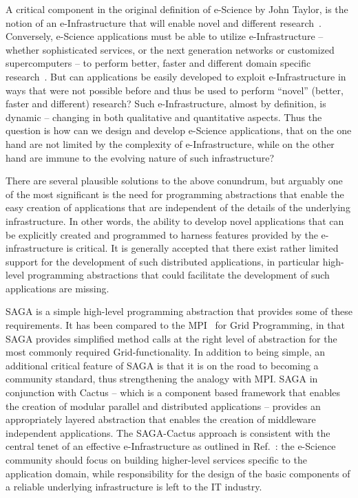 \documentclass[conference,final]{IEEEtran}
\begin{document}
A critical component in the original definition of e-Science by John
Taylor, is the notion of an e-Infrastructure that will enable novel
and different research~\cite{hey03}. Conversely, e-Science
applications must be able to utilize e-Infrastructure -- whether
sophisticated services, or the next generation networks or customized
supercomputers -- to perform better, faster and different domain
specific research~\cite{hey04, hey05}. But can applications be easily
developed to exploit e-Infrastructure in ways that were not possible
before and thus be used to perform ``novel'' (better, faster and
different) research?  Such e-Infrastructure, almost by definition, is
dynamic -- changing in both qualitative and quantitative aspects.
Thus the question is how can we design and develop e-Science
applications, that on the one hand are not limited by the complexity
of e-Infrastructure, while on the other hand are immune to the
evolving nature of such infrastructure?


There are several plausible solutions to the above conundrum, but
arguably one of the most significant is the need for programming
abstractions that enable the easy creation of applications that are
independent of the details of the underlying infrastructure.  In other
words, the ability to develop novel applications that can be
explicitly created and programmed to harness features provided by the
e-infrastructure is critical.  It is generally accepted that there
exist rather limited support for the development of such distributed
applications, in particular high-level programming abstractions that
could facilitate the development of such applications are missing.

SAGA is a simple high-level programming abstraction that provides some
of these requirements.  It has been compared to the
MPI~\cite{mpiforum_url} for Grid Programming, in that SAGA provides
simplified method calls at the right level of abstraction for the most
commonly required Grid-functionality.  In addition to being simple, an
additional critical feature of SAGA is that it is on the road to
becoming a community standard, thus strengthening the analogy with
MPI.  SAGA in conjunction with Cactus -- which is a component based
framework that enables the creation of modular parallel and
distributed applications -- provides an appropriately layered
abstraction that enables the creation of middleware independent
applications.  The SAGA-Cactus approach is consistent with the central
tenet of an effective e-Infrastructure as outlined in
Ref.~\cite{hey05}: the e-Science community should focus on
building higher-level services specific to the application domain,
while responsibility for the design of the basic components of a
reliable underlying infrastructure is left to the IT industry.
\end{document}
